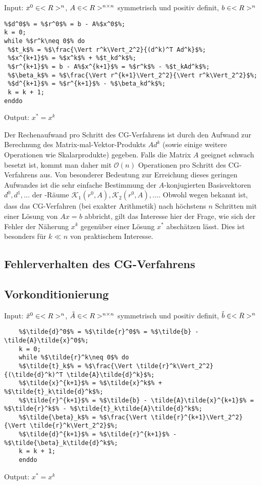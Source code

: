 \begin{algorithm}[CG-Verfahren]
	Input: $x^0\in<R>^n$, $A\in<R>^{n \times n}$ symmetrisch und positiv definit, $b\in<R>^n$
	\begin{lstlisting}
%$d^0$% = %$r^0$% = b - A%$x^0$%;
k = 0;
while %$r^k\neq 0$% do
 %$t_k$% = %$\frac{\Vert r^k\Vert_2^2}{(d^k)^T Ad^k}$%;
 %$x^{k+1}$% = %$x^k$% + %$t_kd^k$%;
 %$r^{k+1}$% = b - A%$x^{k+1}$% = %$r^k$% - %$t_kAd^k$%;
 %$\beta_k$% = %$\frac{\Vert r^{k+1}\Vert_2^2}{\Vert r^k\Vert_2^2}$%;
 %$d^{k+1}$% = %$r^{k+1}$% - %$\beta_kd^k$%;
 k = k + 1;
enddo
	\end{lstlisting}
	Output: $x^\ast=x^k$
\end{algorithm}
Der Rechenaufwand pro Schritt des CG-Verfahrens ist durch den Aufwand zur Berechnung des Matrix-mal-Vektor-Produkts $Ad^k$ (sowie einige weitere Operationen wie Skalarprodukte) gegeben. Falls die Matrix $A$ geeignet schwach besetzt ist, kommt man daher mit $\mathcal{O}(n)$ Operationen pro Schritt des CG-Verfahrens aus. Von besonderer Bedeutung zur Erreichung dieses geringen Aufwandes ist die sehr einfache Bestimmung der $A$-konjugierten Basisvektoren $d^0,d^1,...$ der -Räume $\mathcal{K}_1(r^0,A),\mathcal{K}_2(r^0,A),...$. Obwohl wegen  bekannt ist, dass das CG-Verfahren (bei exakter Arithmetik) nach höchstens $n$ Schritten mit einer Lösung von $Ax=b$ abbricht, gilt das Interesse hier der Frage, wie sich der Fehler der Näherung $x^k$ gegenüber einer Lösung $x^\ast$ abschätzen lässt. Dies ist besonders für $k\ll n$ von praktischem Interesse.

\subsection{Fehlerverhalten des CG-Verfahrens}

\subsection{Vorkonditionierung}

\begin{algorithm}[CG-Verfahren für $\tilde{A}\tilde{x}=\tilde{b}$]
	Input: $\tilde{x}^0\in<R>^n$, $\tilde{A}\in<R>^{n \times n}$ symmetrisch und positiv definit, $\tilde{b}\in<R>^n$
	\begin{lstlisting}
	%$\tilde{d}^0$% = %$\tilde{r}^0$% = %$\tilde{b} - \tilde{A}\tilde{x}^0$%;
	k = 0;
	while %$\tilde{r}^k\neq 0$% do
	%$\tilde{t}_k$% = %$\frac{\Vert \tilde{r}^k\Vert_2^2}{(\tilde{d}^k)^T \tilde{A}\tilde{d}^k}$%;
	%$\tilde{x}^{k+1}$% = %$\tilde{x}^k$% + %$\tilde{t}_k\tilde{d}^k$%;
	%$\tilde{r}^{k+1}$% = %$\tilde{b} - \tilde{A}\tilde{x}^{k+1}$% = %$\tilde{r}^k$% - %$\tilde{t}_k\tilde{A}\tilde{d}^k$%;
	%$\tilde{\beta}_k$% = %$\frac{\Vert \tilde{r}^{k+1}\Vert_2^2}{\Vert \tilde{r}^k\Vert_2^2}$%;
	%$\tilde{d}^{k+1}$% = %$\tilde{r}^{k+1}$% - %$\tilde{\beta}_k\tilde{d}^k$%;
	k = k + 1;
	enddo
	\end{lstlisting}
	Output: $x^\ast=x^k$
\end{algorithm}

